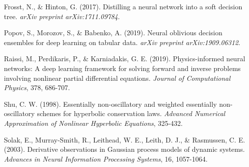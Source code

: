 \documentclass{article}
\begin{document}
\begin{thebibliography}{99}
 Frosst, N., \& Hinton, G. (2017). Distilling a neural network into a soft decision tree. \textit{arXiv preprint arXiv:1711.09784}.

 Popov, S., Morozov, S., \& Babenko, A. (2019). Neural oblivious decision ensembles for deep learning on tabular data. \textit{arXiv preprint arXiv:1909.06312}.

 Raissi, M., Perdikaris, P., \& Karniadakis, G. E. (2019). Physics-informed neural networks: A deep learning framework for solving forward and inverse problems involving nonlinear partial differential equations. \textit{Journal of Computational Physics}, 378, 686-707.

 Shu, C. W. (1998). Essentially non-oscillatory and weighted essentially non-oscillatory schemes for hyperbolic conservation laws. \textit{Advanced Numerical Approximation of Nonlinear Hyperbolic Equations}, 325-432.

 Solak, E., Murray-Smith, R., Leithead, W. E., Leith, D. J., \& Rasmussen, C. E. (2003). Derivative observations in Gaussian process models of dynamic systems. \textit{Advances in Neural Information Processing Systems}, 16, 1057-1064.

\end{thebibliography}
\end{document}
